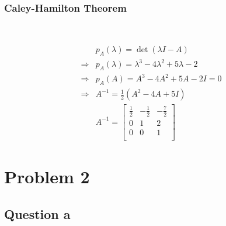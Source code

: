 \documentclass{article}
\begin{document}
\subsubsection{Caley-Hamilton Theorem}

~

\begin{equation*}
    \begin{split}
        &p_A(\lambda)=\det(\lambda I-A)\\
        \Rightarrow&p_A(\lambda)=\lambda^3-4\lambda^2+5\lambda-2\\
        \Rightarrow&p_A(A)=A^3-4A^2+5A-2I=0\\
        \Rightarrow&A^{-1}=\frac{1}{2}(A^2-4A+5I)\\
        &A^{-1}=\begin{bmatrix}
            \frac{1}{2}&-\frac{1}{2}&-\frac{7}{2}\\
            0&1&2\\
            0&0&1\\
        \end{bmatrix}
    \end{split}
\end{equation*}

\newpage

\section{Problem 2}

\subsection{Question a}

~
\end{document}
